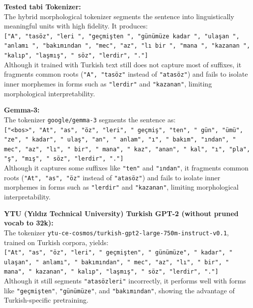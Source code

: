\vspace{1em}

\textbf{Tested tabi Tokenizer:} \\
The hybrid morphological tokenizer segments the sentence into linguistically meaningful units with high fidelity. It produces: \\
\texttt{["A", "tasöz", "leri ", "geçmişten ", "günümüze kadar ", "ulaşan ", "anlamı ", "bakımından ", "mec", "az", "lı bir ", "mana ", "kazanan ", "kalıp", "laşmış", " söz", "lerdir", "."]} \\
Although it trained with Turkish text still does not capture most of suffixes, it fragments common roots (\texttt{"A", "tasöz"} instead of \texttt{"atasöz"}) and fails to isolate inner morphemes in forms such as \texttt{"lerdir"} and \texttt{"kazanan"}, limiting morphological interpretability.

\vspace{1em}

\textbf{Gemma-3:} \\
The tokenizer \texttt{google/gemma-3} segments the sentence as: \\
\texttt{["<bos>", "At", "as", "öz", "leri", " geçmiş", "ten", " gün", "ümü", "ze", " kadar", " ulaş", "an", " anlam", "ı", " bakım", "ından", " mec", "az", "lı", " bir", " mana", " kaz", "anan", " kal", "ı", "pla", "ş", "mış", " söz", "lerdir", "."]} \\
Although it captures some suffixes like \texttt{"ten"} and \texttt{"ından"}, it fragments common roots (\texttt{"At", "as", "öz"} instead of \texttt{"atasöz"}) and fails to isolate inner morphemes in forms such as \texttt{"lerdir"} and \texttt{"kazanan"}, limiting morphological interpretability.

\vspace{1em}

\textbf{YTU (Yıldız Technical University) Turkish GPT-2 (without pruned vocab to 32k):} \\
The tokenizer \texttt{ytu-ce-cosmos/turkish-gpt2-large-750m-instruct-v0.1}, trained on Turkish corpora, yields: \\
\texttt{["At", "as", "öz", "leri", " geçmişten", " günümüze", " kadar", " ulaşan", " anlamı", " bakımından", " mec", "az", "lı", " bir", " mana", " kazanan", " kalıp", "laşmış", " söz", "lerdir", "."]} \\
Although it still segments \texttt{"atasözleri"} incorrectly, it performs well with forms like \texttt{"geçmişten"}, \texttt{"günümüze"}, and \texttt{"bakımından"}, showing the advantage of Turkish-specific pretraining.


